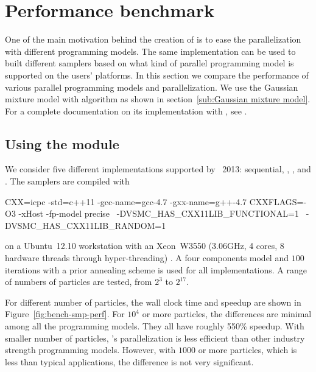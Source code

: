 \section{Performance benchmark}
\label{sec:Performance benchmark}

One of the main motivation behind the creation of \vsmc is to ease the
parallelization with different programming models. The same implementation can
be used to built different samplers based on what kind of parallel programming
model is supported on the users' platforms. In this section we compare the
performance of various \smp parallel programming models and \opencl
parallelization. We use the Gaussian mixture model with \smc[2] algorithm as
shown in section~\ref{sub:Gaussian mixture model}. For a complete
documentation on its implementation with \vsmc, see \cite{vsmcjss}.

\subsection{Using the \protect\smp module}
\label{sub:Using the SMP module}

We consider five different implementations supported by \icpc~2013:
sequential, \tbb, \cilk, \openmp and \cppoo{} . The
samplers are compiled with
\begin{makecode}
CXX=icpc -std=c++11 -gcc-name=gcc-4.7 -gxx-name=g++-4.7
CXXFLAGS=-O3 -xHost -fp-model precise  \
         -DVSMC_HAS_CXX11LIB_FUNCTIONAL=1  \
         -DVSMC_HAS_CXX11LIB_RANDOM=1
\end{makecode}
on a Ubuntu~12.10 workstation with an Xeon~W3550 (3.06GHz, 4 cores, 8 hardware
threads through hyper-threading) \cpu. A four components model and $100$
iterations with a prior annealing scheme is used for all implementations. A
range of numbers of particles are tested, from $2^3$ to $2^{17}$.

For different number of particles, the wall clock time and speedup are shown
in Figure~\ref{fig:bench-smp-perf}. For $10^4$ or more particles, the
differences are minimal among all the programming models. They all have
roughly 550\% speedup. With smaller number of particles, \vsmc's \cppoo
parallelization is less efficient than other industry strength programming
models. However, with $1000$ or more particles, which is less than typical
applications, the difference is not very significant.

